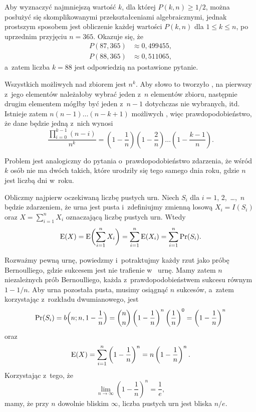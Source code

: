 Aby wyznaczyć najmniejszą wartość $k$, dla której $P(k,n)\ge1/2$, można posłużyć się skomplikowanymi przekształceniami algebraicznymi, jednak prostszym sposobem jest obliczenie każdej wartości $P(k,n)$ dla $1\le k\le n$, po uprzednim przyjęciu $n=365$. Okazuje się, że
\begin{align*}
	P(87,365) &\approx 0{,}499455, \\
    P(88,365) &\approx 0{,}511065,
\end{align*}
a~zatem liczba $k=88$ jest odpowiedzią na postawione pytanie.

\exercise %
Wszystkich możliwych  nad zbiorem  jest $n^k$. Aby słowo to tworzyło , na pierwszy z~jego elementów należałoby wybrać jeden z~$n$ elementów zbioru, następnie drugim elementem mógłby być jeden z~$n-1$ dotychczas nie wybranych, itd. Istnieje zatem $n(n-1)\dots(n-k+1)$ możliwych , więc prawdopodobieństwo, że dane  będzie jedną z~nich wynosi
\[
	\frac{\prod_{i=0}^{k-1}(n-i)}{n^k} = \left(1-\frac{1}{n}\right)\left(1-\frac{2}{n}\right)\dots\left(1-\frac{k-1}{n}\right).
\]

Problem jest analogiczny do pytania o~prawdopodobieństwo zdarzenia, że wśród $k$ osób nie ma dwóch takich, które urodziły się tego samego dnia roku, gdzie $n$ jest liczbą dni w~roku.

\exercise %
Obliczmy najpierw oczekiwaną liczbę pustych urn. Niech $S_i$ dla $i=1$, 2,~\dots,~$n$ będzie zdarzeniem, że  urna jest pusta i~zdefiniujmy zmienną losową $X_i=I(S_i)$ oraz $X=\sum_{i=1}^nX_i$ oznaczającą liczbę pustych urn. Wtedy
\[
	\operatorname{E}(X) = \operatorname{E}\biggl(\sum_{i=1}^nX_i\biggr) = \sum_{i=1}^n\operatorname{E}(X_i) = \sum_{i=1}^n\Pr(S_i).
\]

Rozważmy pewną urnę, powiedzmy  i~potraktujmy każdy rzut jako próbę Bernoulliego, gdzie sukcesem jest nie trafienie w~ urnę. Mamy zatem $n$ niezależnych prób Bernoulliego, każda z~prawdopodobieństwem sukcesu równym $1-1/n$. Aby  urna pozostała pusta, musimy osiągnąć $n$ sukcesów, a~zatem korzystając z~rozkładu dwumianowego, jest
\[
	\Pr(S_i) = b\Bigl(n;n,1-\frac{1}{n}\Bigr) = \binom{n}{n}\left(1-\frac{1}{n}\right)^n\left(\frac{1}{n}\right)^0 = \left(1-\frac{1}{n}\right)^n
\]
oraz
\[
	\operatorname{E}(X) = \sum_{i=1}^n\left(1-\frac{1}{n}\right)^n = n\left(1-\frac{1}{n}\right)^n.
\]
Korzystając z~tego, że
\[
	\lim_{n\to\infty}\left(1-\frac{1}{n}\right)^n = \frac{1}{e},
\]
mamy, że przy $n$ dowolnie bliskim $\infty$, liczba pustych urn jest bliska $n/e$.

